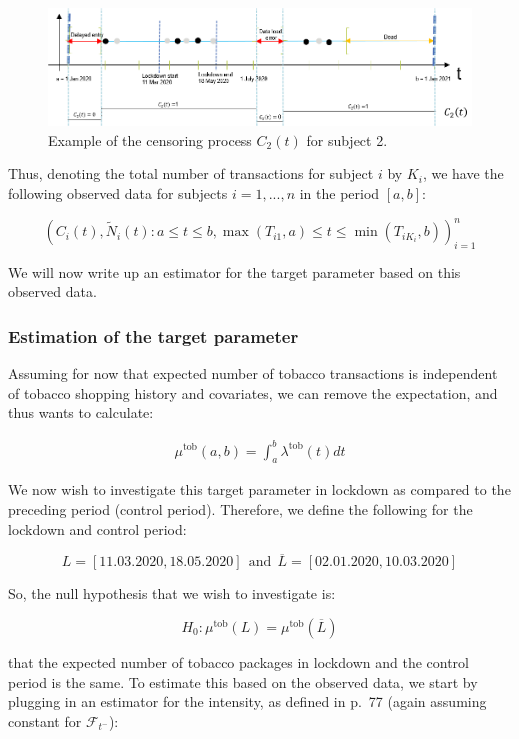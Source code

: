 \documentclass[
  11pt,
]{article}
\begin{document}
\begin{center}
\begin{figure}
\includegraphics[]{Censoring}
\caption{Example of the censoring process $C_2(t)$ for subject 2.}
\label{censoring}
\end{figure}
\end{center}

Thus, denoting the total number of transactions for subject \(i\) by
\(K_i\), we have the following observed data for subjects \(i=1,...,n\)
in the period \([a,b]\):

\[
(C_i(t), \tilde{N}_i(t): a \leq t \leq b, \max(T_{i1},a) \leq t \leq \min(T_{iK_i},b))_{i=1}^n
\]

We will now write up an estimator for the target parameter based on this
observed data.

\hypertarget{estimation-of-the-target-parameter}{%
\subsubsection{Estimation of the target
parameter}\label{estimation-of-the-target-parameter}}

Assuming for now that expected number of tobacco transactions is
independent of tobacco shopping history and covariates, we can remove
the expectation, and thus wants to calculate:

\begin{align*}
\mu^{\text{tob}}(a, b) = \int_a^b \lambda^{\text{tob}} (t) dt
\end{align*}

We now wish to investigate this target parameter in lockdown as compared
to the preceding period (control period). Therefore, we define the
following for the lockdown and control period:

\[
L = [11.03.2020, 18.05.2020] \ \ \text{and} \ \ \overline{L}= [02.01.2020, 10.03.2020]
\]

So, the null hypothesis that we wish to investigate is:

\[
H_0: \mu^{\text{tob}}(L)=\mu^{\text{tob}}(\overline{L})
\]

that the expected number of tobacco packages in lockdown and the control
period is the same. \newline To estimate this based on the observed
data, we start by plugging in an estimator for the intensity, as defined
in \cite{marubini} p.~77 (again assuming constant for
\(\mathcal{F}_{t^-}\)):
\end{document}
